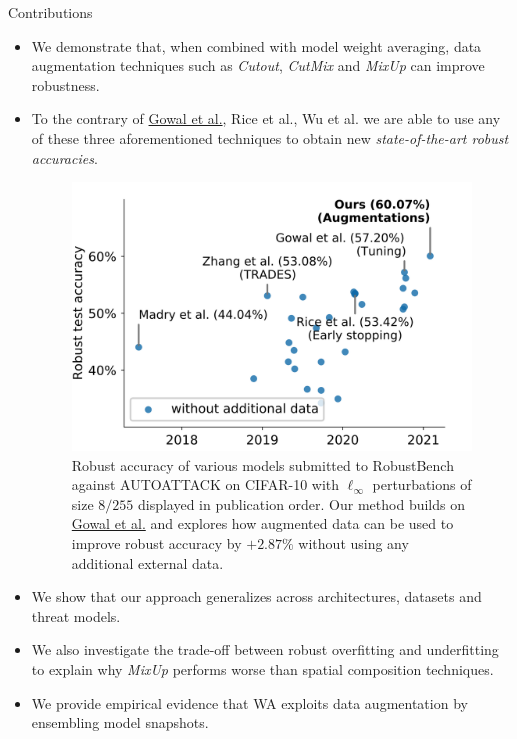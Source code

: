 \begin{frame}{Contributions}
    \begin{itemize}
        \item We demonstrate that, when combined with model weight averaging, data augmentation techniques such as \textit{Cutout}, \textit{CutMix} and \textit{MixUp} can improve robustness.
        \item To the contrary of \href{https://arxiv.org/pdf/2010.03593}{Gowal et al.}, Rice et al., Wu et al. we are able to use any of these three aforementioned techniques to obtain new \emph{state-of-the-art robust accuracies}. 
        \begin{figure}
            \begin{minipage}[c]{0.45\linewidth}
                \includegraphics[width=\linewidth]{pic/sota.png}
            \end{minipage}
            \begin{minipage}[c]{0.45\textwidth}
                \caption{Robust accuracy of various models submitted to RobustBench against AUTOATTACK on CIFAR-10 with $\ell_\infty$ perturbations of size $8/255$ displayed in publication order. Our method builds on \href{https://arxiv.org/pdf/2010.03593}{Gowal et al.} and explores how augmented data can be used to improve robust accuracy by $+2.87\%$ without using any additional external data.} \label{fig:sota}
            \end{minipage}
        \end{figure}
        \item We show that our approach generalizes across architectures, datasets and threat models.
        \item We also investigate the trade-off between robust overfitting and underfitting to explain why \textit{MixUp} performs worse than spatial composition techniques.
        \item We provide empirical evidence that WA exploits data augmentation by ensembling model snapshots.
    \end{itemize}
\end{frame}


